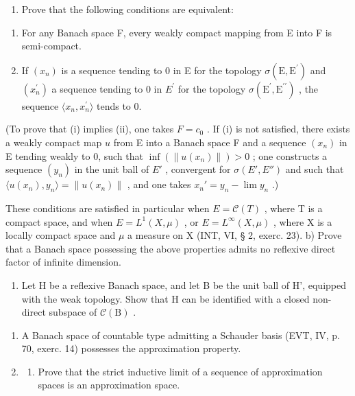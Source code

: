 \begin{enumerate}
\def\labelenumi{\alph{enumi})}
\tightlist
\item
  Prove that the following conditions are equivalent:
\end{enumerate}

\begin{enumerate}
\def\labelenumi{(\roman{enumi})}
\item
  For any Banach space F, every weakly compact mapping from E into F is semi-compact.
\item
  If \((x_{n})\) is a sequence tending to 0 in E for the topology \(\sigma(\mathrm{E},\mathrm{E}^{\prime})\) and \((x_{n}^{\prime})\) a sequence tending to 0 in \(E^{\prime}\) for the topology \(\sigma(\mathrm{E}^{\prime},\mathrm{E}^{\prime\prime})\) , the sequence \(\langle x_{n},x_{n}^{\prime}\rangle\) tends to 0.
\end{enumerate}

(To prove that (i) implies (ii), one takes \(F = c_0\) . If (i) is not satisfied, there exists a weakly compact map \(u\) from E into a Banach space F and a sequence \((x_n)\) in E tending weakly to 0, such that \(\inf(\|u(x_n)\|) > 0\) ; one constructs a sequence \((y_n)\) in the unit ball of \(E'\) , convergent for \(\sigma(E', E'')\) and such that \(\langle u(x_n), y_n \rangle = \|u(x_n)\|\) , and one takes \(x_n' = y_n - \lim y_n\) .)

These conditions are satisfied in particular when \(E = \mathcal{C}(T)\) , where T is a compact space, and when \(E = L^{1}(X, \mu)\) , or \(E = L^{\infty}(X, \mu)\) , where X is a locally compact space and \(\mu\) a measure on X (INT, VI, § 2, exerc. 23). b) Prove that a Banach space possessing the above properties admits no reflexive direct factor of infinite dimension.

\begin{enumerate}
\def\labelenumi{\alph{enumi})}
\setcounter{enumi}{2}
\tightlist
\item
  Let H be a reflexive Banach space, and let B be the unit ball of H', equipped with the weak topology. Show that H can be identified with a closed non-direct subspace of \(\mathcal{C}(\mathrm{B})\) .
\end{enumerate}

\begin{enumerate}
\def\labelenumi{\arabic{enumi})}
\setcounter{enumi}{31}
\item
  A Banach space of countable type admitting a Schauder basis (EVT, IV, p. 70, exerc. 14) possesses the approximation property.
\item
  \begin{enumerate}
  \def\labelenumii{\alph{enumii})}
  \tightlist
  \item
    Prove that the strict inductive limit of a sequence of approximation spaces is an approximation space.
  \end{enumerate}
\end{enumerate}

